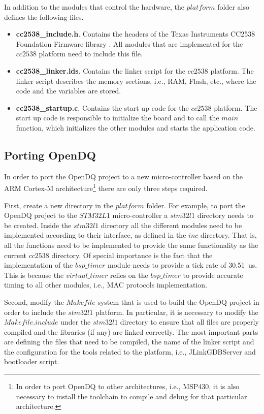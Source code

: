In addition to the modules that control the hardware, the $platform$ folder also defines the following files.
\begin{itemize}
\item \textbf{cc2538\_include.h}. Contains the headers of the Texas Instruments CC2538 Foundation Firmware library \cite{cc2538ff}. All modules that are implemented for the $cc2538$ platform need to include this file.
\item \textbf{cc2538\_linker.lds}. Contains the linker script for the $cc2538$ platform. The linker script describes the memory sections, i.e., RAM, Flash, etc., where the code and the variables are stored.
\item \textbf{cc2538\_startup.c}. Contains the start up code for the $cc2538$ platform. The start up code is responsible to initialize the board and to call the $main$ function, which initializes the other modules and starts the application code.
\end{itemize}

\subsection{Porting OpenDQ}
In order to port the OpenDQ project to a new micro-controller based on the ARM Cortex-M architecture\footnote{In order to port OpenDQ to other architectures, i.e., MSP430, it is also necessary to install the toolchain to compile and debug for that particular architecture.} there are only three steps required.

First, create a new directory in the $platform$ folder. For example, to port the OpenDQ project to the $STM32L1$ micro-controller a $stm32l1$ directory needs to be created. Inside the $stm32l1$ directory all the different modules need to be implemented according to their interface, as defined in the $inc$ directory. That is, all the functions need to be implemented to provide the same functionality as the current $cc2538$ directory. Of special importance is the fact that the implementation of the $bsp\_timer$ module needs to provide a tick rate of 30.51~us. This is because the $virtual\_timer$ relies on the $bsp\_timer$ to provide accurate timing to all other modules, i.e., MAC protocols implementation.

Second, modify the $Makefile$ system that is used to build the OpenDQ project in order to include the $stm32l1$ platform. In particular, it is necessary to modify the $Makefile.include$ under the $stm32l1$ directory to ensure that all files are properly compiled and the libraries (if any) are linked correctly. The most important parts are defining the files that need to be compiled, the name of the linker script and the configuration for the tools related to the platform, i.e., JLinkGDBServer and bootloader script.

